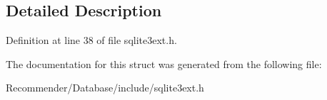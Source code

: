 \subsection{Detailed Description}




Definition at line 38 of file sqlite3ext.h.

The documentation for this struct was generated from the following file:\begin{CompactItemize}
\item 
Recommender/Database/include/sqlite3ext.h\end{CompactItemize}
